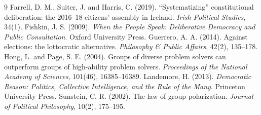 \documentclass{situationist-preprint}
\begin{document}
\begin{thebibliography}{9}\small
{} Farrell, D. M., Suiter, J. and Harris, C. (2019). \enquote{Systematizing} constitutional deliberation: the 2016--18 citizens' assembly in Ireland. \emph{Irish Political Studies}, 34(1).
 Fishkin, J. S. (2009). \emph{When the People Speak: Deliberative Democracy and Public Consultation}. Oxford University Press.
 Guerrero, A. A. (2014). Against elections: the lottocratic alternative. \emph{Philosophy \& Public Affairs}, 42(2), 135--178.
 Hong, L. and Page, S. E. (2004). Groups of diverse problem solvers can outperform groups of high-ability problem solvers. \emph{Proceedings of the National Academy of Sciences}, 101(46), 16385--16389.
 Landemore, H. (2013). \emph{Democratic Reason: Politics, Collective Intelligence, and the Rule of the Many}. Princeton University Press.
 Sunstein, C. R. (2002). The law of group polarization. \emph{Journal of Political Philosophy}, 10(2), 175--195.
\end{thebibliography}
\end{document}
